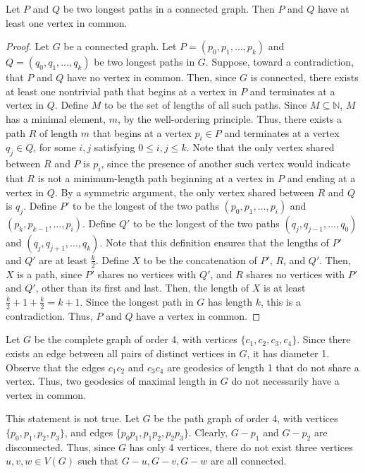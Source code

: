\documentclass[12pt]{article}
\begin{document}
\newpage
{}

 Let $P$ and $Q$ be two longest paths in a connected graph. Then $P$ and $Q$ have at least one vertex in common.
\begin{proof}
    Let $G$ be a connected graph.
    Let $P=(p_0, p_1,\hdots,p_k)$ and $Q=(q_0, q_1,\hdots, q_k)$ be two longest paths in $G$.
    Suppose, toward a contradiction, that $P$ and $Q$ have no vertex in common.
    Then, since $G$ is connected, there exists at least one nontrivial path that begins at a vertex in $P$ and terminates at a vertex in $Q$.
    Define $M$ to be the set of lengths of all such paths.
    Since $M \subseteq \mathbb N$, $M$ has a minimal element, $m$, by the well-ordering principle.
    Thus, there exists a path $R$ of length $m$ that begins at a vertex $p_i \in P$ and terminates at a vertex $q_j \in Q$, for some $i,j$ satisfying $0 \leq i,j \leq k$.
    Note that the only vertex shared between $R$ and $P$ is $p_i$, since the presence of another such vertex would indicate that $R$ is not a minimum-length path beginning at a vertex in $P$ and ending at a vertex in $Q$.
    By a symmetric argument, the only vertex shared between $R$ and $Q$ is $q_j$.
    Define $P'$ to be the longest of the two paths $(p_0, p_1, \hdots, p_i)$ and $(p_k, p_{k-1}, \hdots, p_i)$. %
    Define $Q'$ to be the longest of the two paths $(q_j, q_{j-1}, \hdots, q_0)$ and $(q_j, q_{j+1}, \hdots, q_k)$.
    Note that this definition ensures that the lengths of $P'$ and $Q'$ are at least $\frac k2$.
    Define $X$ to be the concatenation of $P'$, $R$, and $Q'$.
   Then, $X$ is a path, since $P'$ shares no vertices with $Q'$, and $R$ shares no vertices with $P'$ and $Q'$, other than its first and last.
    Then, the length of $X$ is at least $\frac k2 + 1 + \frac k2 = k + 1$.
    Since the longest path in $G$ has length $k$, this is a contradiction.
    Thus, $P$ and $Q$ have a vertex in common.
\end{proof}
\medskip
{}
    Let $G$ be the complete graph of order 4, with vertices $\{c_1, c_2, c_3, c_4\}$.
    Since there exists an edge between all pairs of distinct vertices in $G$, it has diameter 1.
    Observe that the edges $c_1c_2$ and $c_3c_4$ are geodesics of length 1 that do not share a vertex.
    Thus, two geodesics of maximal length in $G$ do not necessarily have a vertex in common.

\bigskip
{}
This statement is not true.
Let $G$ be the path graph of order 4, with vertices $\{p_0, p_1, p_2, p_3\}$, and edges $\{p_0p_1, p_1p_2, p_2p_3\}$.
Clearly, $G - p_1$ and $G - p_2$ are disconnected.
Thus, since $G$ has only 4 vertices, there do not exist three vertices $u,v,w \in V(G)$ such that $G-u,G-v,G-w$ are all connected.
\end{document}
